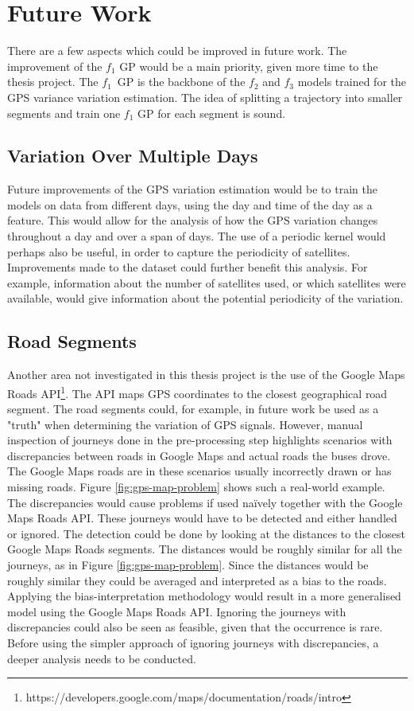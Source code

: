 \section{Future Work}
There are a few aspects which could be improved in future work.
The improvement of the $f_1$ GP would be a main priority, given more time to the thesis project.
The $f_1$ GP is the backbone of the $f_2$ and $f_3$ models trained for the GPS variance variation estimation.
The idea of splitting a trajectory into smaller segments and train one $f_1$ GP for each segment is sound.

\subsection{Variation Over Multiple Days}
Future improvements of the GPS variation estimation would be to train the models on data from different days, using the day and time of the day as a feature.
This would allow for the analysis of how the GPS variation changes throughout a day and over a span of days.
The use of a periodic kernel would perhaps also be useful, in order to capture the periodicity of satellites.
Improvements made to the dataset could further benefit this analysis.
For example, information about the number of satellites used, or which satellites were available, would give information about the potential periodicity of the variation.

\subsection{Road Segments}
Another area not investigated in this thesis project is the use of the Google Maps Roads API\footnote{https://developers.google.com/maps/documentation/roads/intro}.
The API maps GPS coordinates to the closest geographical road segment.
The road segments could, for example, in future work be used as a "truth" when determining the variation of GPS signals.
However, manual inspection of journeys done in the pre-processing step highlights scenarios with discrepancies between roads in Google Maps and actual roads the buses drove.
The Google Maps roads are in these scenarios usually incorrectly drawn or has missing roads.
Figure \ref{fig:gps-map-problem} shows such a real-world example.
The discrepancies would cause problems if used naïvely together with the Google Maps Roads API.
These journeys would have to be detected and either handled or ignored.
The detection could be done by looking at the distances to the closest Google Maps Roads segments.
The distances would be roughly similar for all the journeys, as in Figure \ref{fig:gps-map-problem}.
Since the distances would be roughly similar they could be averaged and interpreted as a bias to the roads.
Applying the bias-interpretation methodology would result in a more generalised model using the Google Maps Roads API.
Ignoring the journeys with discrepancies could also be seen as feasible, given that the occurrence is rare.
Before using the simpler approach of ignoring journeys with discrepancies, a deeper analysis needs to be conducted.
